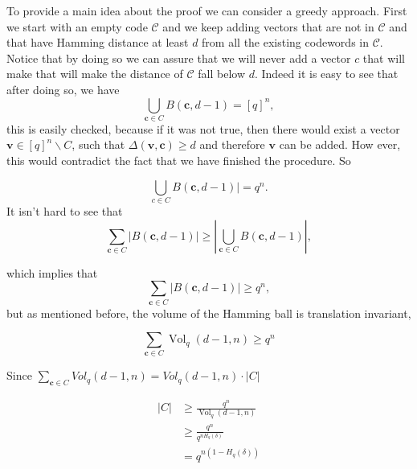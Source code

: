 To provide a main idea about the proof we can consider a greedy approach. First we start with an empty code $\mathcal{C}$ and we keep adding vectors that are not in $\mathcal{C}$ and that have Hamming distance at least $d$ from all the existing codewords in $\mathcal{C}$. Notice that by doing so we can assure that we will never add a vector $c$ that will make that will make the distance of $\mathcal{C}$ fall below $d$. Indeed it is easy to see that after doing so, we have
\begin{equation}
\bigcup_{\mathbf{c} \in C} B(\mathbf{c}, d-1)=[q]^{n},
\label{CH2:Gilbert_Varshamov_1}
\end{equation}
this is easily checked, because if it was not true, then there would exist a vector $\mathbf{v} \in[q]^{n} \backslash C$, such that $\Delta(\mathbf{v}, \mathbf{c}) \geq d$ and therefore $\mathbf{v}$ can be added. How ever, this would contradict the fact that we have finished the procedure. So

\begin{equation}
\bigcup_{c \in C} B(\mathbf{c}, d-1) \mid=q^{n}.
\label{CH2:Gilbert_Varshamov_2}
\end{equation}
It isn't hard to see that
\begin{equation}
\sum_{\mathbf{c} \in C}|B(\mathbf{c}, d-1)| \geq\left|\bigcup_{\mathbf{c} \in C} B(\mathbf{c}, d-1)\right|,
\label{CH2:Gilbert_Varshamov_3}
\end{equation}

which implies that
\begin{equation}
\sum_{\mathbf{c} \in C}|B(\mathbf{c}, d-1)| \geq q^{n},
\label{CH2:Gilbert_Varshamov_4}
\end{equation}
but as mentioned before, the volume of the Hamming ball is translation invariant,

\begin{equation}
\sum_{\mathbf{c} \in C} \operatorname{Vol}_{q}(d-1, n) \geq q^{n}
\label{CH2:Gilbert_Varshamov_5}
\end{equation}

Since $\sum_{\mathbf{c} \in C} V o l_{q}(d-1, n)=V o l_{q}(d-1, n) \cdot|C|$ 

\begin{equation}
\begin{aligned}
|C| & \geq \frac{q^{n}}{\operatorname{Vol}_{q}(d-1, n)} \\
& \geq \frac{q^{n}}{q^{n H_{q}(\delta)}} \\
&=q^{n\left(1-H_{q}(\delta)\right)}
\end{aligned}
\label{CH2:Gilbert_Varshamov_final}
\end{equation}

